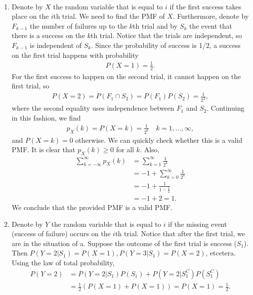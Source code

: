 
\setcounter{theorem}{1}
\begin{exercise}[BH.3.2]
\begin{solution}~
	\begin{enumerate}
		\item Denote by $X$ the random variable that is equal to $i$ if the first success takes place on the $i$th trial. We need to find the PMF of $X$. Furthermore, denote by $F_{k-1}$ the number of failures up to the $k$th trial and by $S_{k}$ the event that there is a success on the $k$th trial. Notice that the trials are independent, so $F_{k-1}$ is independent of $S_{k}$. Since the probability of success is 1/2, a success on the first trial happens with probability
		\begin{align*}
			P(X=1) = \frac{1}{2}.
		\end{align*}
		For the first success to happen on the second trial, it cannot happen on the first trial, so
		\begin{align*}
			P(X=2) = P(F_{1}\cap S_{2}) = P(F_{1})P(S_{2}) = \frac{1}{2^2},
		\end{align*}
		where the second equality uses independence between $F_{1}$ and $S_{2}$.
		Continuing in this fashion, we find
		\begin{align*}
			p_{X}(k)=	P(X=k) = \frac{1}{2^k}\quad k=1,\ldots,\infty,
		\end{align*}
		and $P(X=k)=0$ otherwise. We can quickly check whether this is a valid PMF. It is clear that $p_{X}(k)\geq 0$ for all $k$. Also,
		\begin{align*}
			\sum_{k=-\infty}^{\infty}p_{X}(k) &= \sum_{k=1}^{\infty}\frac{1}{2^k}\\
			&= -1+\sum_{k=0}^{\infty}\frac{1}{2^k}\\
			&= -1+\frac{1}{1-\frac{1}{2}}\\
			&=-1+2 =1.
		\end{align*}
		We conclude that the provided PMF is a valid PMF.
		\item Denote by $Y$ the random variable that is equal to $i$ if the missing event (success of failure) occurs on the $i$th trial. Notice that after the first trial, we are in the situation of a. Suppose the outcome of the first trial is success ($S_{1}$). Then $P(Y=2|S_{1}) = P(X=1), P(Y=3|S_{1}) = P(X=2)$, etcetera. Using the law of total probability,
		\begin{align*}
			P(Y=2) &= P(Y=2|S_{1})P(S_{1}) + P(Y=2|S_{1}^{C})P(S_{1}^{C})\\
			&=\frac{1}{2}(P(X=1) + P(X=1)) = P(X=1) = \frac{1}{2}.

\end{align*}
\end{enumerate}
\end{solution}
\end{exercise}
